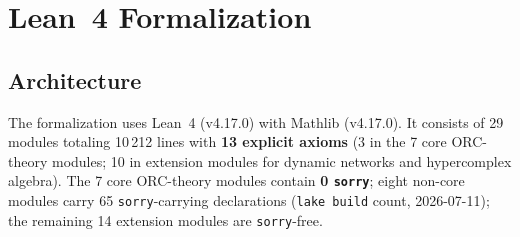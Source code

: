 \documentclass[12pt]{article}
\newcommand{\sorry}{\texttt{sorry}}
\begin{document}
\section{Lean~4 Formalization}
\label{sec:lean}

\subsection{Architecture}

The formalization uses Lean~4 (v4.17.0) with Mathlib (v4.17.0). It consists of 29 modules
totaling 10\,212 lines with \textbf{13 explicit axioms} (3 in the 7 core ORC-theory modules;
10 in extension modules for dynamic networks and hypercomplex algebra). The 7 core
ORC-theory modules contain \textbf{0 \sorry{}}; eight non-core modules carry 65
\sorry{}-carrying declarations (\texttt{lake build} count, 2026-07-11); the remaining 14
extension modules are \sorry{}-free.
\end{document}
